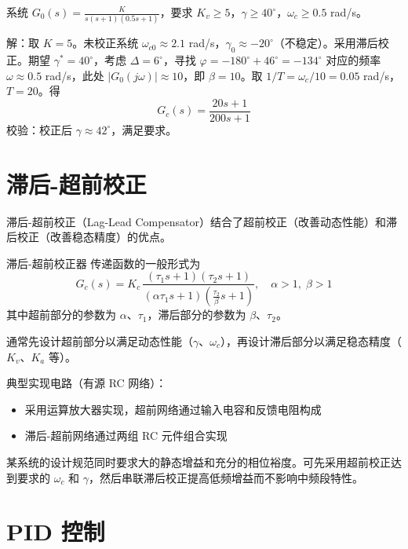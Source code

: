 \begin{example}
系统 $G_0(s) = \frac{K}{s(s+1)(0.5s+1)}$，要求 $K_v \geq 5$，$\gamma \geq 40^{\circ}$，$\omega_c \geq 0.5$ rad/s。

解：取 $K=5$。未校正系统 $\omega_{c0} \approx 2.1$ rad/s，$\gamma_0 \approx -20^{\circ}$（不稳定）。采用滞后校正。期望 $\gamma^* = 40^{\circ}$，考虑 $\Delta=6^{\circ}$，寻找 $\varphi=-180^{\circ}+46^{\circ}=-134^{\circ}$ 对应的频率 $\omega \approx 0.5$ rad/s，此处 $|G_0(j\omega)| \approx 10$，即 $\beta=10$。取 $1/T = \omega_c/10 = 0.05$ rad/s，$T=20$。得
\[
G_c(s) = \frac{20s+1}{200s+1}
\]
校验：校正后 $\gamma \approx 42^{\circ}$，满足要求。
\end{example}

\section{滞后-超前校正}

滞后-超前校正（Lag-Lead Compensator）结合了超前校正（改善动态性能）和滞后校正（改善稳态精度）的优点。

\begin{mydefinition}{滞后-超前校正器}
传递函数的一般形式为
\[
G_c(s) = K_c\,\frac{(\tau_1 s + 1)(\tau_2 s + 1)}{(\alpha\tau_1 s + 1)(\frac{\tau_2}{\beta}s + 1)},\quad \alpha>1,\;\beta>1
\]
其中超前部分的参数为 $\alpha$、$\tau_1$，滞后部分的参数为 $\beta$、$\tau_2$。
\end{mydefinition}

通常先设计超前部分以满足动态性能（$\gamma$、$\omega_c$），再设计滞后部分以满足稳态精度（$K_v$、$K_a$ 等）。

典型实现电路（有源 RC 网络）：
\begin{itemize}
    \item 采用运算放大器实现，超前网络通过输入电容和反馈电阻构成
    \item 滞后-超前网络通过两组 RC 元件组合实现
\end{itemize}

\begin{example}
某系统的设计规范同时要求大的静态增益和充分的相位裕度。可先采用超前校正达到要求的 $\omega_c$ 和 $\gamma$，然后串联滞后校正提高低频增益而不影响中频段特性。
\end{example}

\section{PID 控制}

